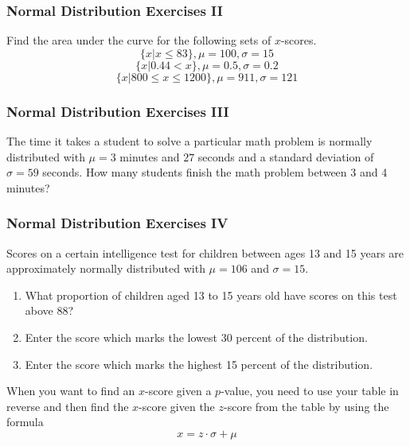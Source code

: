 \documentclass[xcolor=dvipsnames]{beamer}
\begin{document}
\begin{frame}
  \frametitle{Normal Distribution Exercises II}
{\ubung} Find the area under the curve for the
following sets of $x$-scores. 
\begin{equation}
  \label{eq:aequaixe}
\{x|x\leq{}83\},\mu=100,\sigma=15
\end{equation}
\begin{equation}
  \label{eq:oocohdau}
\{x|0.44<x\},\mu=0.5,\sigma=0.2  
\end{equation}
\begin{equation}
  \label{eq:aethohph}
\{x|800\leq{}x\leq{}1200\},\mu=911,\sigma=121
\end{equation}
\end{frame}

\begin{frame}
  \frametitle{Normal Distribution Exercises III}
{\ubung} The time it takes a student to solve a particular math problem is
normally distributed with $\mu=3$ minutes and $27$ seconds and a
standard deviation of $\sigma=59$ seconds. How many students finish
the math problem between 3 and 4 minutes?
\end{frame}

\begin{frame}
  \frametitle{Normal Distribution Exercises IV}
  {\ubung} Scores on a certain intelligence test for children between
  ages 13 and 15 years are approximately normally distributed with
  $\mu=106$ and $\sigma=15$.
  \begin{enumerate}
  \item What proportion of children aged 13 to 15 years old have
    scores on this test above 88?
  \item Enter the score which marks the lowest 30 percent of the
    distribution.
  \item Enter the score which marks the highest 15 percent of the
    distribution.
  \end{enumerate}
When you want to find an $x$-score given a $p$-value, you need to use
your table in reverse and then find the $x$-score given the $z$-score
from the table by using the formula
\begin{equation}
  \label{eq:aedecaba}
  x=z\cdot\sigma+\mu
\end{equation}
\end{frame}
\end{document}

